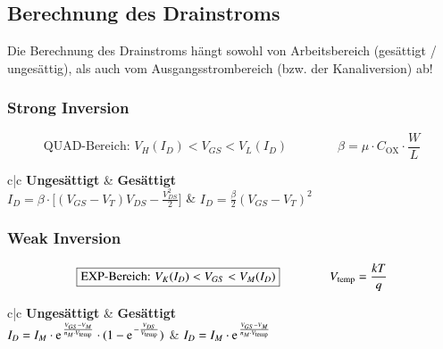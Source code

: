\subsection{Berechnung des Drainstroms}

Die Berechnung des Drainstroms hängt sowohl von Arbeitsbereich (gesättigt / ungesättig), als auch vom Ausgangsstrombereich (bzw. der Kanaliversion) ab!


\subsubsection{Strong Inversion}

\vspace{-0.3cm}

$$ \boxed{ \text{QUAD-Bereich: } V_H(I_D) < V_{GS} < V_L(I_D) } \qquad \qquad \beta = \mu \cdot C_{\text{OX}} \cdot \frac{W}{L} $$


\renewcommand{\arraystretch}{1.5}
\begin{ctabular}{c|c}
    \textbf{Ungesättigt}                                                            & \textbf{Gesättigt}                        \\
    $I_D = \beta \cdot \bigg[ (V_{GS} - V_T) V_{DS} - \frac{V_{DS}^2}{2} \bigg]$    & $I_D = \frac{\beta}{2} (V_{GS} - V_T)^2$
\end{ctabular}
\renewcommand{\arraystretch}{1}



\subsubsection{Weak Inversion}

\vspace{-0.3cm}

$$ \boxed{ \text{EXP-Bereich: } V_K(I_D) < V_{GS} < V_M(I_D)} \qquad \qquad V_{\rm temp} = \frac{kT}{q} $$


\renewcommand{\arraystretch}{1.5}
\begin{ctabular}{c|c}
    \textbf{Ungesättigt}                                                                                                & \textbf{Gesättigt}                                                    \\
    $I_D = I_M \cdot \e^{\frac{V_{GS} - V_M}{n_M \cdot V_\text{temp}}} \cdot (1 - \e^{-\frac{V_{DS}}{V_\text{temp}}})$  & $I_D = I_M \cdot \e^{\frac{V_{GS} - V_M}{n_M \cdot V_\text{temp}}}$
\end{ctabular}
\renewcommand{\arraystretch}{1}


